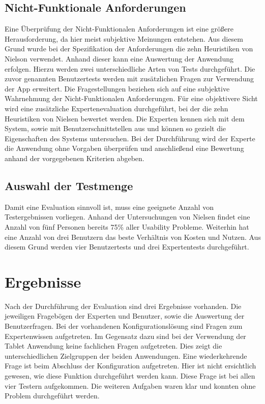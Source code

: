 \subsection{Nicht-Funktionale Anforderungen}
Eine Überprüfung der Nicht-Funktionalen Anforderungen ist eine größere Herausforderung, da hier meist subjektive Meinungen entstehen. Aus diesem Grund wurde bei der Spezifikation der Anforderungen die zehn Heuristiken von Nielson verwendet. Anhand dieser kann eine Auswertung der Anwendung erfolgen. Hierzu werden zwei unterschiedliche Arten von Tests durchgeführt. Die zuvor genannten Benutzertests werden mit zusätzlichen Fragen zur Verwendung der App erweitert. Die Fragestellungen beziehen sich auf eine subjektive Wahrnehmung der Nicht-Funktionalen Anforderungen. Für eine objektivere Sicht wird eine zusätzliche Expertenevaluation durchgeführt, bei der die zehn Heuristiken von Nielsen bewertet werden. Die Experten kennen sich mit dem System, sowie mit Benutzerschnittstellen aus und können so gezielt die Eigenschaften des Systems untersuchen. Bei der Durchführung wird der Experte die Anwendung ohne Vorgaben überprüfen und anschließend eine Bewertung anhand der vorgegebenen Kriterien abgeben. 

\subsection{Auswahl der Testmenge}
Damit eine Evaluation sinnvoll ist, muss eine geeignete Anzahl von Testergebnissen vorliegen. Anhand der Untersuchungen von Nielsen \cite{bib:countTests} findet eine Anzahl von fünf Personen bereits 75\% aller Usability Probleme. Weiterhin hat eine Anzahl von drei Benutzern das beste Verhältnis von Kosten und Nutzen. Aus diesem Grund werden vier Benutzertests und drei Expertentests durchgeführt. 

\section{Ergebnisse}
Nach der Durchführung der Evaluation sind drei Ergebnisse vorhanden. Die jeweiligen Fragebögen der Experten und Benutzer, sowie die Auswertung der Benutzerfragen. Bei der vorhandenen Konfigurationslösung sind Fragen zum Expertenwissen aufgetreten. Im Gegensatz dazu sind bei der Verwendung der Tablet Anwendung keine fachlichen Fragen aufgetreten. Dies zeigt die unterschiedlichen Zielgruppen der beiden Anwendungen. Eine wiederkehrende Frage ist beim Abschluss der Konfiguration aufgetreten. Hier ist nicht ersichtlich gewesen, wie diese Funktion durchgeführt werden kann. Diese Frage ist bei allen vier Testern aufgekommen. Die weiteren Aufgaben waren klar und konnten ohne Problem durchgeführt werden. 

